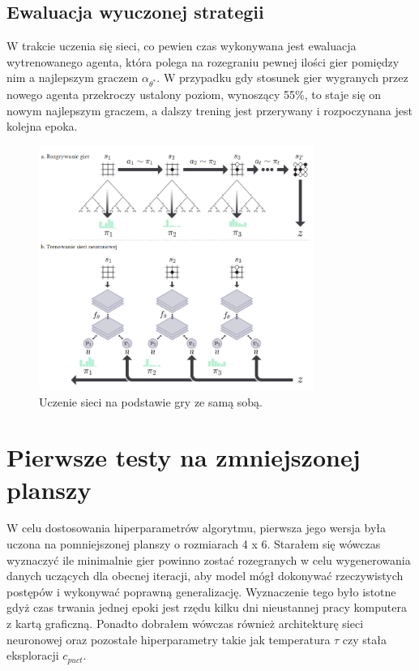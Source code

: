 \documentclass[licencjacka]{pracamgr}
\begin{document}
\subsection{Ewaluacja wyuczonej strategii}

W trakcie uczenia się sieci, co pewien czas wykonywana jest ewaluacja wytrenowanego agenta, która polega na rozegraniu pewnej ilości gier pomiędzy nim a najlepszym graczem $\alpha_{\theta^\ast}$. W przypadku gdy stosunek gier wygranych przez nowego agenta przekroczy ustalony poziom, wynoszący 55\%, to staje się on nowym najlepszym graczem, a dalszy trening jest przerywany i rozpoczynana jest kolejna epoka.


\begin{figure}[ht!]
  \centering
  \includegraphics[width=0.8\textwidth]{alphago-self-play}
  \caption{Uczenie sieci na podstawie gry ze samą sobą. \cite{alphagozero}}
\end{figure}

\newpage

\section{Pierwsze testy na zmniejszonej planszy}

W celu dostosowania hiperparametrów algorytmu, pierwsza jego wersja była uczona na pomniejszonej planszy o rozmiarach 4 x 6. Starałem się wówczas wyznaczyć ile minimalnie gier powinno zostać rozegranych w celu wygenerowania danych uczących dla obecnej iteracji, aby model mógł dokonywać rzeczywistych postępów i wykonywać poprawną generalizację. Wyznaczenie tego było istotne gdyż czas trwania jednej epoki jest rzędu kilku dni nieustannej pracy komputera z kartą graficzną. Ponadto dobrałem wówczas również architekturę sieci neuronowej oraz pozostałe hiperparametry takie jak temperatura $\tau$ czy stała eksploracji $c_{puct}$.
\end{document}
